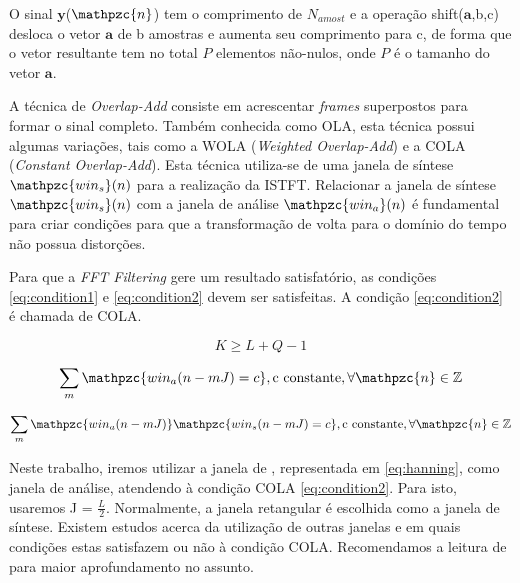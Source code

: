         O sinal $\mathbf{y}$($\mathpzc{n}$) tem o comprimento de $N_{amost}$ e a operação shift($\mathbf{a}$,b,c) desloca o vetor $\mathbf{a}$ de b amostras e aumenta seu comprimento para c, de forma que o vetor resultante tem no total $P$ elementos não-nulos, onde $P$ é o tamanho do vetor $\mathbf{a}$.
        
        A técnica de \textit{Overlap-Add} consiste em acrescentar \textit{frames} superpostos para formar o sinal completo. Também conhecida como OLA, esta técnica possui algumas variações, tais como a WOLA (\textit{Weighted Overlap-Add}) e a COLA (\textit{Constant Overlap-Add}). Esta técnica utiliza-se de uma janela de síntese $\mathpzc{win_s}(n)$ para a realização da ISTFT. Relacionar a janela de síntese $\mathpzc{win_s}(n)$ com a janela de análise $\mathpzc{win_a}(n)$ é fundamental para criar condições para que a transformação de volta para o domínio do tempo não possua distorções. 
        
        Para que a \textit{FFT Filtering} gere um resultado satisfatório, as condições \ref{eq:condition1} e \ref{eq:condition2} devem ser satisfeitas. A condição \ref{eq:condition2} é chamada de COLA.
        
        \begin{equation}\label{eq:condition1}
            K \geq L + Q - 1
        \end{equation}
        
        \begin{equation}\label{eq:condition2}
            \sum_m \mathpzc{win_a(n - mJ) = c},\text{c constante}, \forall\mathpzc{n} \in \mathbb{Z}
        \end{equation}
        
        \begin{equation}\label{eq:condition3}
            \sum_m \mathpzc{win_a(n - mJ)}\mathpzc{win_s(n - mJ) = c}, \text{c constante}, \forall\mathpzc{n} \in \mathbb{Z}
        \end{equation}
        
        
        Neste trabalho, iremos utilizar a janela de , representada em \ref{eq:hanning}, como janela de análise, atendendo à condição COLA \ref{eq:condition2}. Para isto, usaremos J = $\frac{L}{2}$. Normalmente, a janela retangular é escolhida como a janela de síntese. Existem estudos acerca da utilização de outras janelas e em quais condições estas satisfazem ou não à condição COLA. Recomendamos a leitura de \cite{LuizVictorio} para maior aprofundamento no assunto.
        
